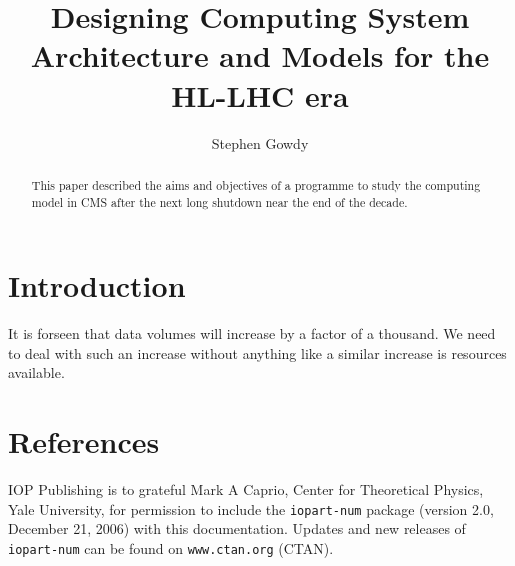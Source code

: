 \documentclass[a4paper]{jpconf}
\begin{document}
\title{Designing Computing System Architecture and Models for the HL-LHC era}

\author{Stephen Gowdy}

\address{4c Mains Drive, Erskine, PA8 7JQ, UK}


\begin{abstract}
This paper described the aims and objectives of a programme to study
the computing model in CMS after the next long shutdown near the end
of the decade.
\end{abstract}

\section{Introduction}
It is forseen that data volumes will increase by a factor of a
thousand. We need to deal with such an increase without anything like
a similar increase is resources available.

 

\section*{References}
\begin{thebibliography}{9}
 IOP Publishing is to grateful Mark A Caprio, Center for Theoretical Physics, Yale University, for permission to include the {\tt iopart-num} \BibTeX package (version 2.0, December 21, 2006) with  this documentation. Updates and new releases of {\tt iopart-num} can be found on \verb"www.ctan.org" (CTAN). 
\end{thebibliography}
\end{document}
